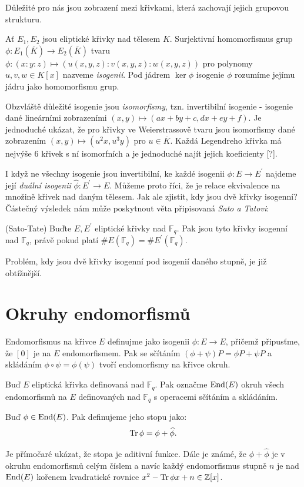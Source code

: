 \documentclass[12pt]{report}
\begin{document}
Důležité pro nás jsou zobrazení mezi křivkami, která zachovají jejich grupovou strukturu.

\begin{definice}
Ať $E_1,E_2$ jsou eliptické křivky nad tělesem $K$. Surjektivní homomorfismus grup $\phi: E_1(\overline{K}) \longrightarrow E_2(\overline{K})$ tvaru $\phi : (x:y:z) \longmapsto (u(x,y,z):v(x,y,z):w(x,y,z))$ pro polynomy $u,v,w \in K[x]$ nazveme \textit{isogenií}. Pod jádrem $\ker \phi$ isogenie $\phi$ rozumíme jejímu jádru jako homomorfismu grup. 
\end{definice}

Obzvláště důležité isogenie jsou \textit{isomorfismy}, tzn. invertibilní isogenie - isogenie dané lineárními zobrazeními $(x,y) \longmapsto (ax+by+c,dx+ey+f)$. Je jednoduché ukázat, že pro křivky ve Weierstrassově tvaru jsou isomorfismy dané zobrazením $(x,y) \longmapsto (u^2 x, u^3 y)$ pro $u \in \overline{K}$. Každá Legendreho křivka má nejvýše $6$ křivek s ní isomorfních a je jednoduché najít jejich koeficienty [?].

I když ne všechny isogenie jsou invertibilní, ke každé isogenii $\phi : E \longrightarrow E^{\prime}$ najdeme její \textit{duální isogenii} $\widehat{\phi} : E^{\prime} \longrightarrow E$. Můžeme proto říci, že  je relace ekvivalence na množině křivek nad daným tělesem. Jak ale zjistit, kdy jsou dvě křivky isogenní? Částečný výsledek nám může poskytnout věta připisovaná \textit{Sato a Tatovi}:
\begin{veta}\label{satotate} (Sato-Tate)
Buďte $E,E^\prime$ eliptické křivky nad $\mathbb{F}_q$. Pak jsou tyto křivky isogenní nad $\mathbb{F}_q$, právě pokud platí $\#E (\mathbb{F}_q) = \#E^\prime (\mathbb{F}_q)$.
\end{veta}

Problém, kdy jsou dvě křivky isogenní pod isogenií daného stupně, je již obtížnější.

\section{Okruhy endomorfismů}
Endomorfismus na křivce $E$ definujme jako isogenii $\phi : E \longrightarrow E$, přičemž připusťme, že $[0]$ je na $E$ endomorfismem. Pak se sčítáním $(\phi+\psi) P = \phi P + \psi P$ a skládáním $\phi \circ \psi = \phi(\psi)$ tvoří endomorfismy na křivce okruh.
\begin{definice}
Buď $E$ eliptická křivka definovaná nad $\mathbb{F}_q$. Pak označme $\operatorname{End}(E)$ okruh všech endomorfismů na $E$ definovaných nad $\mathbb{F}_q$ s operacemi sčítáním a skládáním.
\end{definice}
\begin{definice}
Buď $\phi \in \operatorname{End}(E)$. Pak definujeme jeho stopu jako:
$$\operatorname{Tr} \phi = \phi + \widehat{\phi}.$$
\end{definice}
Je přímočaré ukázat, že stopa je aditivní funkce. Dále je známé, že $\phi+\widehat{\phi}$ je v okruhu endomorfismů celým číslem a navíc každý endomorfismus stupně $n$ je nad $\operatorname{End}(E)$ kořenem kvadratické rovnice $x^2 - \operatorname{Tr} \phi x + n \in \mathbb{Z}[x]$. 
\end{document}
